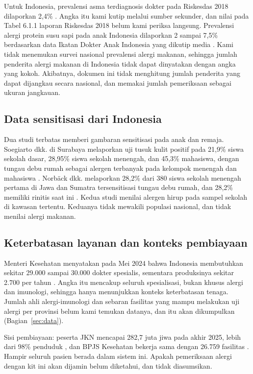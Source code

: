 \documentclass[11pt,a4paper]{article}
\begin{document}
Untuk Indonesia, prevalensi asma terdiagnosis dokter pada Riskesdas 2018 dilaporkan 2,4\% \cite{riskesdas}. Angka itu kami kutip melalui sumber sekunder, dan nilai pada Tabel 6.1.1 laporan Riskesdas 2018 belum kami periksa langsung. Prevalensi alergi protein susu sapi pada anak Indonesia dilaporkan 2 sampai 7,5\% berdasarkan data Ikatan Dokter Anak Indonesia yang dikutip media \cite{antara}. Kami tidak menemukan survei nasional prevalensi alergi makanan, sehingga jumlah penderita alergi makanan di Indonesia tidak dapat dinyatakan dengan angka yang kokoh. Akibatnya, dokumen ini tidak menghitung jumlah penderita yang dapat dijangkau secara nasional, dan memakai jumlah pemeriksaan sebagai ukuran jangkauan.

\subsection{Data sensitisasi dari Indonesia}

Dua studi terbatas memberi gambaran sensitisasi pada anak dan remaja. Soegiarto dkk. di Surabaya melaporkan uji tusuk kulit positif pada 21,9\% siswa sekolah dasar, 28,95\% siswa sekolah menengah, dan 45,3\% mahasiswa, dengan tungau debu rumah sebagai alergen terbanyak pada kelompok menengah dan mahasiswa \cite{soegiarto}. Norb\"ack dkk. melaporkan 28,2\% dari 380 siswa sekolah menengah pertama di Jawa dan Sumatra tersensitisasi tungau debu rumah, dan 28,2\% memiliki rinitis saat ini \cite{norback}. Kedua studi menilai alergen hirup pada sampel sekolah di kawasan tertentu. Keduanya tidak mewakili populasi nasional, dan tidak menilai alergi makanan.

\subsection{Keterbatasan layanan dan konteks pembiayaan}

Menteri Kesehatan menyatakan pada Mei 2024 bahwa Indonesia membutuhkan sekitar 29.000 sampai 30.000 dokter spesialis, sementara produksinya sekitar 2.700 per tahun \cite{kabarbursa}. Angka itu mencakup seluruh spesialisasi, bukan khusus alergi dan imunologi, sehingga hanya menunjukkan konteks keterbatasan tenaga. Jumlah ahli alergi-imunologi dan sebaran fasilitas yang mampu melakukan uji alergi per provinsi belum kami temukan datanya, dan itu akan dikumpulkan (Bagian~\ref{sec:data}).

Sisi pembiayaan: peserta JKN mencapai 282,7 juta jiwa pada akhir 2025, lebih dari 98\% penduduk \cite{jkn}, dan BPJS Kesehatan bekerja sama dengan 26.759 fasilitas \cite{bpjs}. Hampir seluruh pasien berada dalam sistem ini. Apakah pemeriksaan alergi dengan kit ini akan dijamin belum diketahui, dan tidak diasumsikan.
\end{document}
